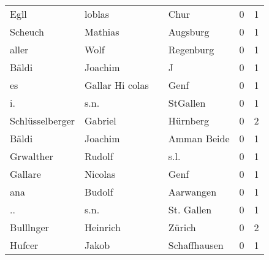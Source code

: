 \begin{tabular}{llllrr}
                     Egll &                             loblas &             &                                        Chur &          0 &         1 \\
                  Scheuch &                            Mathias &             &                                    Augsburg &          0 &         1 \\
                    aller &                               Wolf &             &                                   Regenburg &          0 &         1 \\
                    Bäldi &                            Joachim &             &                                           J &          0 &         1 \\
                       es &                    Gallar Hi colas &             &                                        Genf &          0 &         1 \\
                       i. &                               s.n. &             &                                    StGallen &          0 &         1 \\
          Schlüsselberger &                            Gabriel &             &                                    Hürnberg &          0 &         2 \\
                    Bäldi &                            Joachim &             &                                 Amman Beide &          0 &         1 \\
                Grwalther &                             Rudolf &             &                                        s.l. &          0 &         1 \\
                  Gallare &                            Nicolas &             &                                        Genf &          0 &         1 \\
                      ana &                             Budolf &             &                                   Aarwangen &          0 &         1 \\
                       .. &                               s.n. &             &                                  St. Gallen &          0 &         1 \\
                Bulllnger &                           Heinrich &             &                                      Zürich &          0 &         2 \\
                   Hufcer &                              Jakob &             &                                Schaffhausen &          0 &         1 \\

\end{tabular}
